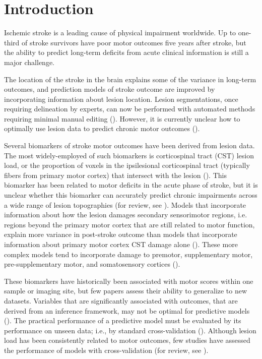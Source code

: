 \documentclass[10pt]{article}
\begin{document}
\section{Introduction}
Ischemic stroke is a leading cause of physical impairment worldwide. Up to one-third of stroke survivors have poor motor outcomes five years after stroke, but the ability to predict long-term deficits from acute clinical information is still a major challenge.

The location of the stroke in the brain explains some of the variance in long-term outcomes, and prediction models of stroke outcome are improved by incorporating information about lesion location. Lesion segmentations, once requiring  delineation by experts, can now be performed with automated methods requiring minimal manual editing (\cite{Pustina2016-qu}). However, it is currently unclear how to optimally use  lesion data to predict chronic motor outcomes (\cite{Sperber2020-kp, Kasties2021-rm}). 

Several biomarkers of stroke motor outcomes have been derived from lesion data. The most widely-employed of such biomarkers is corticospinal tract (CST) lesion load, or the proportion of voxels in the ipsilesional corticospinal tract (typically fibers from primary motor cortex) that intersect with the lesion (\cite{Zhu2010-qh, Feng2015-du}). This biomarker has been related to motor deficits in the acute phase of stroke, but it is unclear whether this biomarker can accurately predict chronic impairments across a wide range of lesion topographies (for review, see \cite{Kim2017-xe}). Models that incorporate information about how the lesion damages secondary sensorimotor regions, i.e. regions beyond the primary motor cortex that are still related to motor function, explain more variance in post-stroke outcome than models that incorporate information about primary motor cortex CST damage alone (\cite{Ito2022-em, Sperber2021-lw, Rondina2016-ds, Rondina2017-ij, Schulz2012-yy}). These more complex models tend to incorporate damage to premotor, supplementary motor, pre-supplementary motor, and somatosensory cortices (\cite{Ito2022-em,Schulz2012-yy, Sperber2021-lw, Rondina2016-ds, Rondina2017-ij}). 

These biomarkers have historically been associated with motor scores within one sample or imaging site, but few papers assess their ability to generalize to new datasets. Variables that are significantly associated with outcomes, that are derived from an inference framework, may not be optimal for predictive models (\cite{Bzdok2020-py}). The practical performance of a predictive model must be evaluated by its performance on unseen data; i.e., by standard cross-validation (\cite{Hastie2001-or}). Although lesion load has been consistently related to motor outcomes, few studies have assessed the performance of models with cross-validation (for review, see \cite{Kim2017-xe}).
\end{document}
